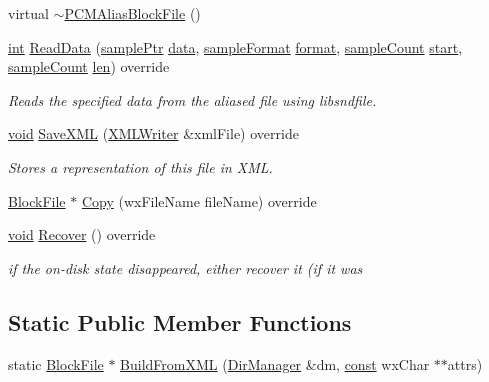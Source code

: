 \begin{DoxyCompactItemize}
\item 
virtual \hyperlink{class_p_c_m_alias_block_file_aee1aac257375ca56e34cd9bd372bf98c}{$\sim$\+P\+C\+M\+Alias\+Block\+File} ()
\item 
\hyperlink{xmltok_8h_a5a0d4a5641ce434f1d23533f2b2e6653}{int} \hyperlink{class_p_c_m_alias_block_file_ae1db29217139e4e04c129b1be9cc6dc7}{Read\+Data} (\hyperlink{include_2audacity_2_types_8h_aaafb46d1caf7c79262fec96b577215fe}{sample\+Ptr} \hyperlink{lib_2expat_8h_ac39e72a1de1cb50dbdc54b08d0432a24}{data}, \hyperlink{include_2audacity_2_types_8h_a9938d2e2f6adef23e745cd80ef379792}{sample\+Format} \hyperlink{_export_p_c_m_8cpp_a317afff57d87a89158c2b038d37b2b08}{format}, \hyperlink{include_2audacity_2_types_8h_afa427e1f521ea5ec12d054e8bd4d0f71}{sample\+Count} \hyperlink{seqread_8c_ac503262ae470564980711da4f78b1181}{start}, \hyperlink{include_2audacity_2_types_8h_afa427e1f521ea5ec12d054e8bd4d0f71}{sample\+Count} \hyperlink{lib_2expat_8h_af86d325fecfc8f47b61fbf5a5146f582}{len}) override
\begin{DoxyCompactList}\small\item\em Reads the specified data from the aliased file using libsndfile. \end{DoxyCompactList}\item 
\hyperlink{sound_8c_ae35f5844602719cf66324f4de2a658b3}{void} \hyperlink{class_p_c_m_alias_block_file_ab20853be8b5afdcb0573ff82e92fbe96}{Save\+X\+ML} (\hyperlink{class_x_m_l_writer}{X\+M\+L\+Writer} \&xml\+File) override
\begin{DoxyCompactList}\small\item\em Stores a representation of this file in X\+ML. \end{DoxyCompactList}\item 
\hyperlink{class_block_file}{Block\+File} $\ast$ \hyperlink{class_p_c_m_alias_block_file_a89af149b32993d976a05639292366ebd}{Copy} (wx\+File\+Name file\+Name) override
\item 
\hyperlink{sound_8c_ae35f5844602719cf66324f4de2a658b3}{void} \hyperlink{class_p_c_m_alias_block_file_a9d912e149c49e942d58dbbd363fb33be}{Recover} () override
\begin{DoxyCompactList}\small\item\em if the on-\/disk state disappeared, either recover it (if it was \end{DoxyCompactList}\end{DoxyCompactItemize}
\subsection*{Static Public Member Functions}
\begin{DoxyCompactItemize}
\item 
static \hyperlink{class_block_file}{Block\+File} $\ast$ \hyperlink{class_p_c_m_alias_block_file_a85761dc326eef8aef7f6972ff752de7d}{Build\+From\+X\+ML} (\hyperlink{class_dir_manager}{Dir\+Manager} \&dm, \hyperlink{getopt1_8c_a2c212835823e3c54a8ab6d95c652660e}{const} wx\+Char $\ast$$\ast$attrs)
\end{DoxyCompactItemize}
